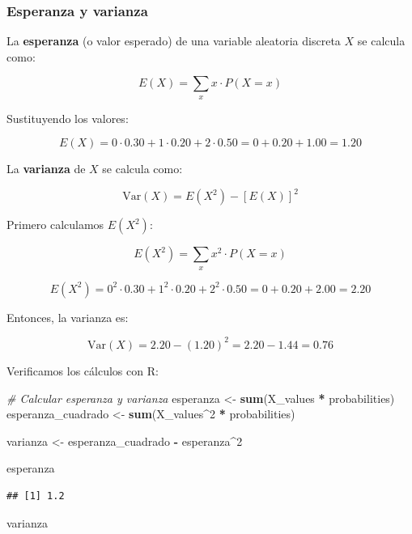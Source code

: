 \documentclass[
]{article}
\newenvironment{Shaded}{\begin{snugshade}}{\end{snugshade}}
\newcommand{\CommentTok}[1]{\textcolor[rgb]{0.56,0.35,0.01}{\textit{#1}}}
\newcommand{\DecValTok}[1]{\textcolor[rgb]{0.00,0.00,0.81}{#1}}
\newcommand{\FunctionTok}[1]{\textcolor[rgb]{0.13,0.29,0.53}{\textbf{#1}}}
\newcommand{\NormalTok}[1]{#1}
\newcommand{\OtherTok}[1]{\textcolor[rgb]{0.56,0.35,0.01}{#1}}
\newcommand{\SpecialCharTok}[1]{\textcolor[rgb]{0.81,0.36,0.00}{\textbf{#1}}}
\begin{document}
\subsubsection{Esperanza y varianza}\label{esperanza-y-varianza}

La \textbf{esperanza} (o valor esperado) de una variable aleatoria discreta \(X\) se calcula como:

\[
E(X) = \sum_{x} x \cdot P(X = x)
\]

Sustituyendo los valores:

\[
E(X) = 0 \cdot 0.30 + 1 \cdot 0.20 + 2 \cdot 0.50 = 0 + 0.20 + 1.00 = 1.20
\]

La \textbf{varianza} de \(X\) se calcula como:

\[
\text{Var}(X) = E(X^2) - [E(X)]^2
\]

Primero calculamos \(E(X^2)\):

\[
E(X^2) = \sum_{x} x^2 \cdot P(X = x)
\]

\[
E(X^2) = 0^2 \cdot 0.30 + 1^2 \cdot 0.20 + 2^2 \cdot 0.50 = 0 + 0.20 + 2.00 = 2.20
\]

Entonces, la varianza es:

\[
\text{Var}(X) = 2.20 - (1.20)^2 = 2.20 - 1.44 = 0.76
\]

Verificamos los cálculos con R:

\begin{Shaded}
\begin{Highlighting}[]
\CommentTok{\# Calcular esperanza y varianza}
\NormalTok{esperanza }\OtherTok{\textless{}{-}} \FunctionTok{sum}\NormalTok{(X\_values }\SpecialCharTok{*}\NormalTok{ probabilities)}
\NormalTok{esperanza\_cuadrado }\OtherTok{\textless{}{-}} \FunctionTok{sum}\NormalTok{(X\_values}\SpecialCharTok{\^{}}\DecValTok{2} \SpecialCharTok{*}\NormalTok{ probabilities)}

\NormalTok{varianza }\OtherTok{\textless{}{-}}\NormalTok{ esperanza\_cuadrado }\SpecialCharTok{{-}}\NormalTok{ esperanza}\SpecialCharTok{\^{}}\DecValTok{2}

\NormalTok{esperanza}
\end{Highlighting}
\end{Shaded}

\begin{verbatim}
## [1] 1.2
\end{verbatim}

\begin{Shaded}
\begin{Highlighting}[]
\NormalTok{varianza}
\end{Highlighting}
\end{Shaded}
\end{document}
